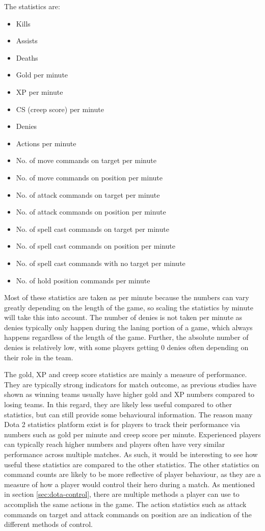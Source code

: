 \documentclass[Report.tex]{subfiles}
\begin{document}
The statistics are:
\begin{itemize}
\item Kills
\item Assists
\item Deaths
\item Gold per minute
\item XP per minute
\item CS (creep score) per minute
\item Denies
\item Actions per minute
\item No. of move commands on target per minute
\item No. of move commands on position per minute
\item No. of attack commands on target per minute
\item No. of attack commands on position per minute
\item No. of spell cast commands on target per minute
\item No. of spell cast commands on position per minute
\item No. of spell cast commands with no target per minute
\item No. of hold position commands per minute
\end{itemize}
Most of these statistics are taken as per minute because the numbers can vary greatly depending on the length of the game, so scaling the statistics by minute will take this into account. The number of denies is not taken per minute as denies typically only happen during the laning portion of a game, which always happens regardless of the length of the game. Further, the absolute number of denies is relatively low, with some players getting 0 denies often depending on their role in the team.

The gold, XP and creep score statistics are mainly a measure of performance. They are typically strong indicators for match outcome, as previous studies have shown \cite{dota-mixed-rank-win, dota-kinkade, dota-pu-yang, dota-yang} as winning teams usually have higher gold and XP numbers compared to losing teams. In this regard, they are likely less useful compared to other statistics, but can still provide some behavioural information. The reason many Dota 2 statistics platform exist is for players to track their performance via numbers such as gold per minute and creep score per minute. Experienced players can typically reach higher numbers and players often have very similar performance across multiple matches. As such, it would be interesting to see how useful these statistics are compared to the other statistics. The other statistics on command counts are likely to be more reflective of player behaviour, as they are a measure of how a player would control their hero during a match. As mentioned in section \ref{sec:dota-control}, there are multiple methods a player can use to accomplish the same actions in the game. The action statistics such as attack commands on target and attack commands on position are an indication of the different methods of control.
\end{document}
